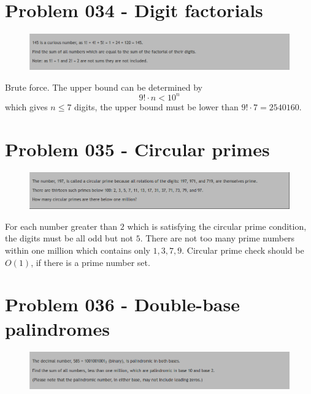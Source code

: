 \section{Problem 034 - Digit factorials}
\begin{prob}
	\begin{figure}[htb!]
		\begin{center}
			\includegraphics[scale = 0.4]{pic/034.png}
		\end{center}
	\end{figure}
\end{prob}
\begin{sol}
Brute force. The upper bound can be determined by 
$$9! \cdot n < 10^{n}$$
which gives $n \le 7$ digits, the upper bound must be lower than $9! \cdot 7 = 2540160$. 
\end{sol}

\section{Problem 035 - Circular primes}
\begin{prob}
	\begin{figure}[htb!]
		\begin{center}
			\includegraphics[scale = 0.4]{pic/035.png}
		\end{center}
	\end{figure}
\end{prob}
\begin{sol}
For each number greater than $2$ which is satisfying the circular prime condition, the digits must be all odd but not $5$. There are not too many prime numbers within one million which contains only $1,3,7,9$. Circular prime check should be $O(1)$, if there is a prime number set.
\end{sol}
\section{Problem 036 - Double-base palindromes}
\begin{prob}
	\begin{figure}[htb!]
		\begin{center}
			\includegraphics[scale = 0.4]{pic/036.png}
		\end{center}
	\end{figure}
\end{prob}
